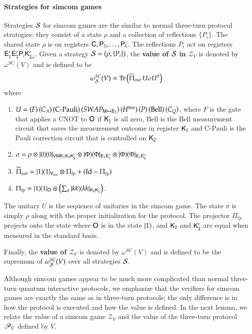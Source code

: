 \paragraph{Strategies for simcom games} Strategies $\mathcal{S}$ for simcom games are the similar to normal three-turn protocol strategies; they consist of a state $\rho$ and a collection of reflections $\{ P_i \}$. The shared state $\rho$ is on registers ${\mathsf{C}}, {\mathsf{P}}_1,\ldots,{\mathsf{P}}_k$. The reflections $P_i$ act on registers ${\mathsf{E}}_1' {\mathsf{E}}_2' {\mathsf{P}}_i {\mathsf{K}}_{2,i}'$. Given a strategy $\mathcal{S} = (\rho,\{P_i\})$, the \textbf{value of $\mathcal{S}$ in $\mathscr{Z}_V$} is denoted by $\omega^{SC}(V)$ and is defined to be
\[
	\omega^{SC}_{\mathcal{S}}(V) = \operatorname{Tr} \left( \widetilde{\Pi}_{out} \, U \sigma U^\dagger\right)
\]
where
\begin{enumerate}
	\item $U =  (F) \, (C_A) \,  (\text{C-Pauli}) \, (SWAP_{{\mathsf{M}} \leftrightarrow {\mathsf{E}}_2}) \, (H^{\otimes m}) \, (P)\, (\mathrm{Bell})\, (C_Q)$, where $F$ is the gate that applies a CNOT to ${\mathsf{O}}$ if ${\mathsf{K}}_1$ is all zero, $\mathrm{Bell}$ is the Bell measurement circuit that saves the measurement outcome in register ${\mathsf{K}}_1$ and $\text{C-Pauli}$ is the Pauli correction circuit that is controlled on ${\mathsf{K}}_2$
	\item $\sigma = \rho \otimes |0\rangle\! \langle 0|_{{\mathsf{V}} {\mathsf{M}} {\mathsf{K}}_1 {\mathsf{K}}_2 {\mathsf{K}}_2'} \otimes |\Phi\rangle\! \langle \Phi|_{{\mathsf{E}}_1 {\mathsf{E}}_1'} \otimes |\Phi\rangle\! \langle \Phi|_{{\mathsf{E}}_2 {\mathsf{E}}_2'}$
	\item  $\widetilde{\Pi}_{out} = |1\rangle\! \langle 1|_{{\mathsf{V}}_{out}} \otimes \Pi_{tp} + (\mathop{\mathrm{Id}}\!\mathinner{} - \Pi_{tp})$
	\item $\Pi_{tp} = |1\rangle\! \langle 1|_{{\mathsf{O}}} \otimes \left( \sum_{k} |kk\rangle\! \langle kk|_{{\mathsf{K}}_2 {\mathsf{K}}_2'}\right)$.
\end{enumerate}
The unitary $U$ is the sequence of unitaries in the simcom game. The state $\sigma$ is simply $\rho$ along with the proper initialization for the protocol. The projector $\Pi_{tp}$ projects onto the state where ${\mathsf{O}}$ is in the state $|1\rangle$, and ${\mathsf{K}}_2$ and ${\mathsf{K}}_2'$ are equal when measured in the standard basis.

Finally, the \textbf{value of $\mathscr{Z}_V$} is denoted by $\omega^{SC}(V)$ and is defined to be the supremum of $\omega^{SC}_{\mathcal{S}}(V)$ over all strategies $\mathcal{S}$.


Although simcom games appear to be much more complicated than normal three-turn quantum interactive protocols, we emphasize that the verifiers for simcom games are exactly the same as in three-turn protocols; the only difference is in how the protocol is executed and how the value is defined. In the next lemma, we relate the value of a simcom game $\mathscr{Z}_V$ and the value of the three-turn protocol $\mathscr{P}_V$ defined by $V$.

